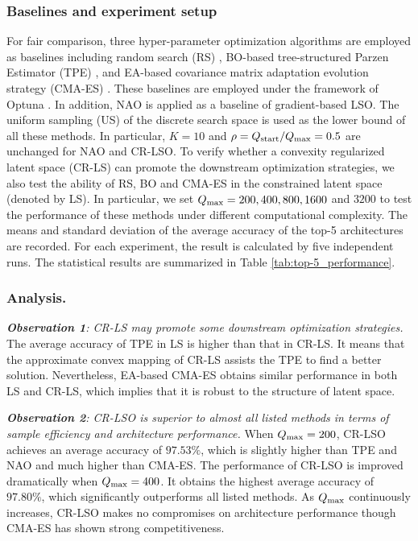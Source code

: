 \documentclass[10pt,twocolumn,letterpaper]{article}
\begin{document}
\subsubsection{Baselines and experiment setup}
For fair comparison, three hyper-parameter optimization algorithms are employed as baselines including random search (RS) \cite{bergstra2012random}, BO-based tree-structured Parzen Estimator (TPE) \cite{bergstra2013making,ozaki2020multiobjective}, and EA-based covariance matrix adaptation evolution strategy (CMA-ES) \cite{nomura2021warm, hansen2016cma}. These baselines are employed under the framework of Optuna \cite{akiba2019optuna}. In addition, NAO \cite{luo2018neural} is applied as a baseline of gradient-based LSO. The uniform sampling (US) of the discrete search space is used as the lower bound of all these methods. In particular, $K=10$ and $\rho = Q_{\rm start}/Q_{\rm max} = 0.5$ are unchanged for NAO and CR-LSO. To verify whether a convexity regularized latent space (CR-LS) can promote the downstream optimization strategies, we also test the ability of RS, BO and CMA-ES in the constrained latent space (denoted by LS). In particular, we set $Q_{\rm max} = 200, 400, 800, 1600$ and $3200$ to test the performance of these methods under different computational complexity. The means and standard deviation of the average accuracy of the top-5 architectures are recorded. For each experiment, the result is calculated by five independent runs. The statistical results are summarized in Table \ref{tab:top-5_performance}.
\subsubsection{Analysis.} 
\emph{\textbf{Observation 1}: CR-LS may promote some downstream optimization strategies.} The average accuracy of TPE in LS is higher than that in CR-LS. It means that the approximate convex mapping of CR-LS assists the TPE to find a better solution. Nevertheless, EA-based CMA-ES obtains similar performance in both LS and CR-LS, which implies that it is robust to the structure of latent space.

\emph{\textbf{Observation 2}: CR-LSO is superior to almost all listed methods in terms of sample efficiency and architecture performance.} When $Q_{\rm max} = 200$, CR-LSO achieves an average accuracy of $97.53\%$, which is slightly higher than TPE and NAO and much higher than CMA-ES. The performance of CR-LSO is improved dramatically when $Q_{\rm max} = 400$. It obtains the highest average accuracy of $97.80\%$, which significantly outperforms all listed methods. As $Q_{\rm max}$ continuously increases, CR-LSO makes no compromises on architecture performance though CMA-ES has shown strong competitiveness. 
\end{document}
